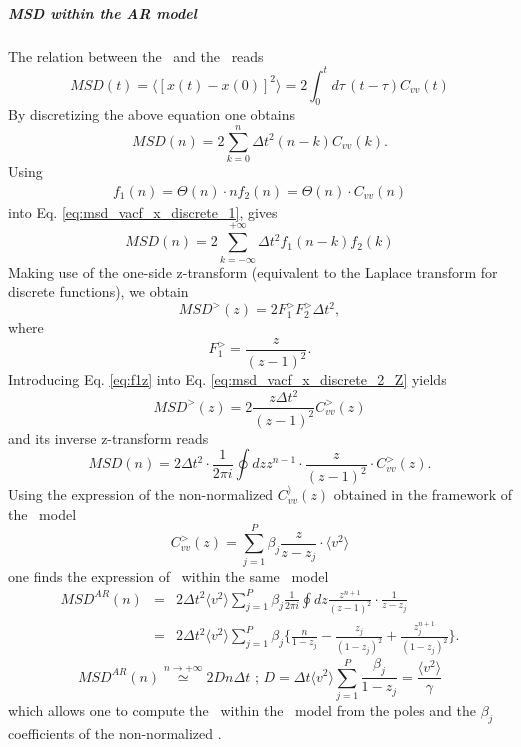 \documentclass[a4paper,11pt]{report}
\begin{document}
\subparagraph{MSD within the AR model} The relation between the \VACF\ and the \MSD\ reads
\begin{equation}
\label{eq:msd_vacf_x}
{MSD}(t)=\langle[x(t)-x(0)]^2\rangle=2 \int_{0}^{t}d\tau\,(t - \tau)
C_{vv}(t)
\end{equation}
By discretizing the above equation one obtains
\begin{equation}
\label{eq:msd_vacf_x_discrete_1}
MSD(n)=2 \sum_{k=0}^n \Delta t^2(n-k)C_{vv}(k).
\end{equation}
Using
\begin{eqnarray}
f_1(n)=\Theta(n)\cdot n
f_2(n)=\Theta(n)\cdot C_{vv}(n)
\end{eqnarray}
into Eq. \ref{eq:msd_vacf_x_discrete_1}, gives
\begin{equation}
\label{eq:msd_vacf_x_discrete_2}
MSD(n)=2 \sum_{k=-\infty}^{+\infty} \Delta t^2f_1(n-k)f_2(k)
\end{equation}
Making use of the one-side z-transform (equivalent to the Laplace transform for discrete functions), we obtain 
\begin{equation}
\label{eq:msd_vacf_x_discrete_2_Z}
{MSD}^{>}(z)= 2 F_1^{>} F_2^{>}\Delta t^2 ,
\end{equation}
where
\begin{equation}
\label{eq:f1z}
F_1^{>}=\frac{z}{(z-1)^2}.
\end{equation}
Introducing Eq. \ref{eq:f1z} into Eq. \ref{eq:msd_vacf_x_discrete_2_Z} yields
\begin{equation}
\label{msd_z}
MSD^{>}(z)= 2 \frac{z\Delta t^2}{(z-1)^2}C_{vv}^{>}(z)
\end{equation}
and its inverse z-transform reads
\begin{equation}
\label{inv_Z}
{MSD}(n)= 2\Delta t^2\cdot\frac{1}{2\pi i}\oint dz z^{n-1}\cdot\frac{z}{(z-1)^2}\cdot C_{vv}^{>}(z).
\end{equation}
Using the expression of the non-normalized $C_{vv}^{\rangle}(z)$ obtained in the framework of the \AR\ model 
\begin{equation}
C_{vv}^{>}(z)= \sum_{j=1}^P\beta_j\frac{z}{z-z_j}\cdot\langle v^2\rangle
\end{equation}
one finds the expression of \MSD\ within the same \AR\ model
\begin{eqnarray}
MSD^{AR}(n) & = & 2\Delta t^2\langle v^2\rangle \sum_{j=1}^P\beta_j \frac{1}{2\pi i}\oint dz \frac{z^{n+1}}{(z-1)^2}\cdot\frac{1}{z-z_j}\\
& = & 2\Delta t^2\langle v^2\rangle \sum_{j=1}^P\beta_j \{\frac{n}{1-z_j}-\frac{z_j}{(1-z_j)^2}+\frac{z_j^{n+1}}{(1-z_j)^2}\}.
\end{eqnarray}
\begin{equation}
MSD^{AR}(n)\stackrel{n\rightarrow +\infty}{\simeq} 2Dn\Delta t \mbox{  ;  } 
D=\Delta t\langle v^2\rangle \sum_{j=1}^P\frac{\beta_j}{1-z_j}=\frac{\langle v^2\rangle}{\gamma}
\end{equation}
which allows one to compute the \MSD\ within the \AR\ model from the poles and the $\beta_j$ coefficients of the non-normalized \VACF.
\end{document}

